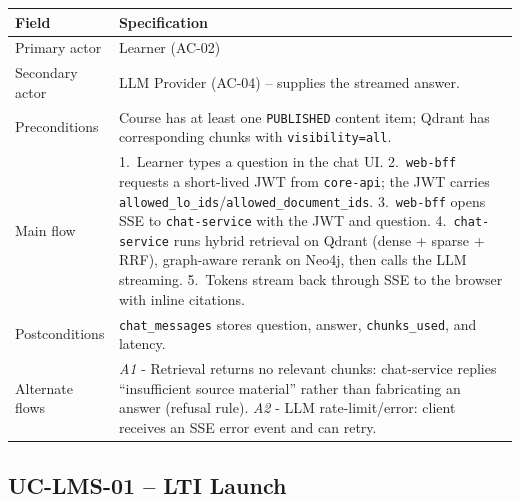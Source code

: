 \begin{longtable}{|p{3.2cm}|p{10.3cm}|}
\hline
\textbf{Field} & \textbf{Specification} \\
\hline
\endhead
Primary actor & Learner (AC-02) \\
\hline
Secondary actor & LLM Provider (AC-04) -- supplies the streamed
    answer. \\
\hline
Preconditions & Course has at least one \texttt{PUBLISHED} content
    item; Qdrant has corresponding chunks with
    \texttt{visibility=all}. \\
\hline
Main flow &
    1.\ Learner types a question in the chat UI.
    2.\ \texttt{web-bff} requests a short-lived JWT from
    \texttt{core-api}; the JWT carries
    \texttt{allowed\_lo\_ids}/\texttt{allowed\_document\_ids}.
    3.\ \texttt{web-bff} opens SSE to \texttt{chat-service} with the
    JWT and question.
    4.\ \texttt{chat-service} runs hybrid retrieval on Qdrant (dense +
    sparse + RRF), graph-aware rerank on Neo4j, then calls the LLM
    streaming.
    5.\ Tokens stream back through SSE to the browser with inline
    citations. \\
\hline
Postconditions & \texttt{chat\_messages} stores question, answer,
    \texttt{chunks\_used}, and latency. \\
\hline
Alternate flows &
    \emph{A1} - Retrieval returns no relevant chunks: chat-service
    replies ``insufficient source material'' rather than fabricating
    an answer (refusal rule).
    \emph{A2} - LLM rate-limit/error: client receives an SSE error
    event and can retry. \\
\hline
\end{longtable}

\subsection*{UC-LMS-01 -- LTI Launch}

